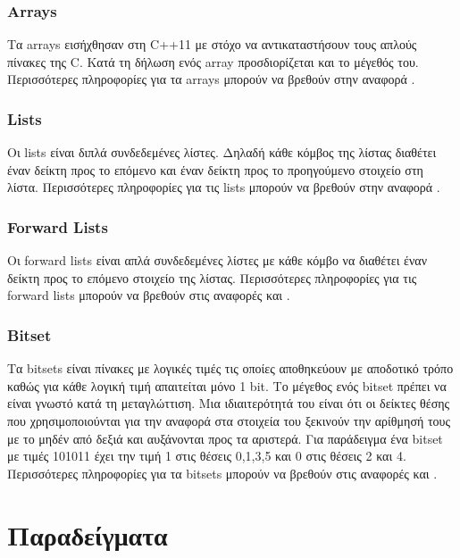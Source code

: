 \subsubsection{Arrays}
Τα arrays εισήχθησαν στη C++11 με στόχο να αντικαταστήσουν τους απλούς πίνακες της C. Κατά τη δήλωση ενός array προσδιορίζεται και το μέγεθός του. Περισσότερες πληροφορίες για τα arrays μπορούν να βρεθούν στην αναφορά \cite{g4garray}.

\subsubsection{Lists}
Οι lists είναι διπλά συνδεδεμένες λίστες. Δηλαδή κάθε κόμβος της λίστας διαθέτει έναν δείκτη προς το επόμενο και έναν δείκτη προς το προηγούμενο στοιχείο στη λίστα. Περισσότερες πληροφορίες για τις lists μπορούν να βρεθούν στην αναφορά \cite{g4glist}.

\subsubsection{Forward Lists}
Οι forward lists είναι απλά συνδεδεμένες λίστες με κάθε κόμβο να διαθέτει έναν δείκτη προς το επόμενο στοιχείο της λίστας. Περισσότερες πληροφορίες για τις forward lists μπορούν να βρεθούν στις αναφορές \cite{g4gforwardlist1} και \cite{g4gforwardlist2}.

\subsubsection{Bitset}
Τα bitsets είναι πίνακες με λογικές τιμές τις οποίες αποθηκεύουν με αποδοτικό τρόπο καθώς για κάθε λογική τιμή απαιτείται μόνο 1 bit. Το μέγεθος ενός bitset πρέπει να είναι γνωστό κατά τη μεταγλώττιση. Μια ιδιαιτερότητά του είναι ότι οι δείκτες θέσης που χρησιμοποιούνται για την αναφορά στα στοιχεία του ξεκινούν την αρίθμησή τους με το μηδέν από δεξιά και αυξάνονται προς τα αριστερά. Για παράδειγμα ένα bitset με τιμές 101011 έχει την τιμή 1 στις θέσεις 0,1,3,5 και 0 στις θέσεις 2 και 4. Περισσότερες πληροφορίες για τα bitsets μπορούν να βρεθούν στις αναφορές \cite{g4gbitset1} και \cite{g4gbitset2}.


\section{Παραδείγματα}
